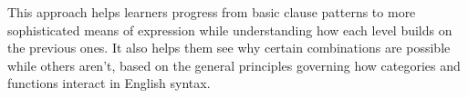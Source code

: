 This approach helps learners progress from basic clause patterns to more sophisticated means of expression while understanding how each level builds on the previous ones. It also helps them see why certain combinations are possible while others aren't, based on the general principles governing how categories and functions interact in English syntax.